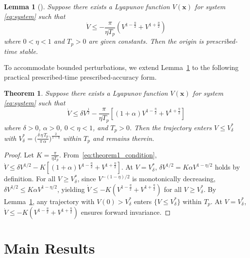 \documentclass[journal]{new-aiaa}
\newtheorem{theorem}{Theorem}
\newtheorem{lemma}{Lemma}
\begin{document}
\begin{lemma}[\cite{anguiano-gijon_predefined-time_2019}]\label{lem:PT}
Suppose there exists a Lyapunov function $V(\boldsymbol{x})$ for system \eqref{eq:system} such that
\begin{equation}
\dot V \le -\frac{\pi}{\eta T_p}\left(V^{1-\tfrac{\eta}{2}}+V^{1+\tfrac{\eta}{2}}\right)
\label{eq:lemma_PT_cond}
\end{equation}
where $0<\eta<1$ and $T_p>0$ are given constants. Then the origin is prescribed-time stable.
\end{lemma}

To accommodate bounded perturbations, we extend Lemma~\ref{lem:PT} to the following practical prescribed-time prescribed-accuracy form.

\begin{theorem}\label{thm:practical_PT}
Suppose there exists a Lyapunov function $V(\boldsymbol{x})$ for system \eqref{eq:system} such that
\begin{equation}
\dot V \le \delta V^{\tfrac{1}{2}} - \frac{\pi}{\eta T_p}\left[(1+\alpha) V^{1-\tfrac{\eta}{2}}+V^{1+\tfrac{\eta}{2}}\right]
\label{eq:theorem1_condition}
\end{equation}
where $\delta>0$, $\alpha>0$, $0<\eta<1$, and $T_p>0$. Then the trajectory enters
$V\le V^*_\delta$ with $V^*_\delta = \bigl(\frac{\delta\,\eta\,T_p}{\pi\,\alpha}\bigr)^{\frac{2}{1-\eta}}$
within $T_p$ and remains therein.
\end{theorem}

\begin{proof}
Let $K = \frac{\pi}{\eta T_p}$. From~\eqref{eq:theorem1_condition},
$\dot V \le \delta V^{1/2} - K[ (1+\alpha)V^{1-\frac{\eta}{2}} + V^{1+\frac{\eta}{2}} ]$.
At $V=V^*_\delta$, $\delta V^{1/2} = K\alpha V^{1-\eta/2}$ holds by definition.
For all $V\ge V^*_\delta$, since $V^{-(1-\eta)/2}$ is monotonically decreasing,
$\delta V^{1/2} \le K\alpha V^{1-\eta/2}$, yielding
$\dot V \le -K( V^{1-\frac{\eta}{2}} + V^{1+\frac{\eta}{2}} )$ for all $V\ge V^*_\delta$.
By Lemma~\ref{lem:PT}, any trajectory with $V(0)>V^*_\delta$ enters $\{V\le V^*_\delta\}$ within $T_p$.
At $V=V^*_\delta$, $\dot V\le -K(V^{1-\frac{\eta}{2}}+V^{1+\frac{\eta}{2}})$ ensures forward invariance.
\end{proof}

\section{Main Results}
\label{section:MAINRES}
\end{document}
